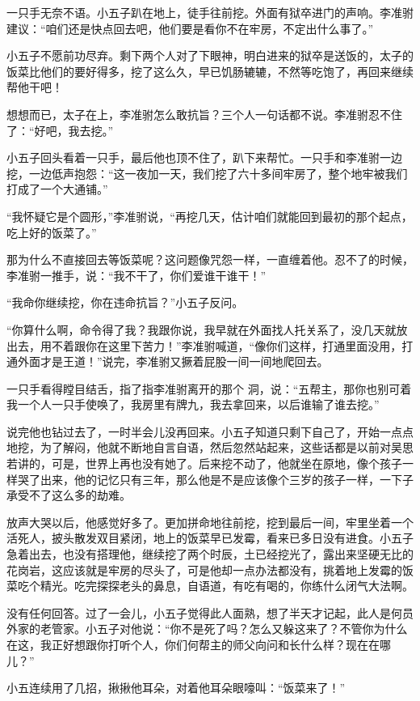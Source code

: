 一只手无奈不语。小五子趴在地上，徒手往前挖。外面有狱卒进门的声响。李准驸建议：“咱们还是快点回去吧，他们要是看你不在牢房，不定出什么事了。”

小五子不愿前功尽弃。剩下两个人对了下眼神，明白进来的狱卒是送饭的，太子的饭菜比他们的要好得多，挖了这么久，早已饥肠辘辘，不然等吃饱了，再回来继续帮他干吧！

想想而已，太子在上，李准驸怎么敢抗旨？三个人一句话都不说。李准驸忍不住了：“好吧，我去挖。”

小五子回头看着一只手，最后他也顶不住了，趴下来帮忙。一只手和李准驸一边挖，一边低声抱怨：“这一夜加一天，我们挖了六十多间牢房了，整个地牢被我们打成了一个大通铺。”

“我怀疑它是个圆形，”李准驸说，“再挖几天，估计咱们就能回到最初的那个起点，吃上好的饭菜了。”

那为什么不直接回去等饭菜呢？这问题像咒怨一样，一直缠着他。忍不了的时候，李准驸一推手，说：“我不干了，你们爱谁干谁干！”

“我命你继续挖，你在违命抗旨？”小五子反问。

“你算什么啊，命令得了我？我跟你说，我早就在外面找人托关系了，没几天就放出去，用不着跟你在这里下苦力！”李准驸喊道，“像你们这样，打通里面没用，打通外面才是王道！”说完，李准驸又撅着屁股一间一间地爬回去。

一只手看得瞠目结舌，指了指李准驸离开的那个
洞，说：“五帮主，那你也别可着我一个人一只手使唤了，我房里有牌九，我去拿回来，以后谁输了谁去挖。”

说完他也钻过去了，一时半会儿没再回来。小五子知道只剩下自己了，开始一点点地挖，为了解闷，他就不断地自言自语，然后忽然站起来，这些话都是以前对吴思若讲的，可是，世界上再也没有她了。后来挖不动了，他就坐在原地，像个孩子一样哭了出来，他的记忆只有三年，那么他是不是应该像个三岁的孩子一样，一下子承受不了这么多的劫难。

放声大哭以后，他感觉好多了。更加拼命地往前挖，挖到最后一间，牢里坐着一个活死人，披头散发双目紧闭，地上的饭菜早已发霉，看来已多日没有进食。小五子急着出去，也没有搭理他，继续挖了两个时辰，土已经挖光了，露出来坚硬无比的花岗岩，这应该就是牢房的尽头了，可是他却一点办法都没有，挑着地上发霉的饭菜吃个精光。吃完探探老头的鼻息，自语道，有吃有喝的，你练什么闭气大法啊。

没有任何回答。过了一会儿，小五子觉得此人面熟，想了半天才记起，此人是何员外家的老管家。小五子对他说：“你不是死了吗？怎么又躲这来了？不管你为什么在这，我正好想跟你打听个人，你们何帮主的师父向问和长什么样？现在在哪儿？”

小五连续用了几招，揪揪他耳朵，对着他耳朵眼嚎叫：“饭菜来了！”

